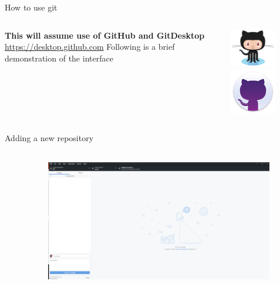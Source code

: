 \documentclass[10pt]{beamer}
\begin{document}
{\begin{frame}[fragile]{How to use git}
\begin{columns}[T]
\begin{column}{.8\textwidth}
\textbf{This will assume use of GitHub and GitDesktop\\}
\url{https://desktop.github.com} \newline \newline 
Following is a brief demonstration of the interface
\end{column}
\begin{column}{.2\textwidth}
\includegraphics[width=2cm]{Figs/git/Octocat} \newline \newline \newline 
\includegraphics[width=2cm]{Figs/git/gitdesktop}
\end{column}
\end{columns}
\end{frame}


\begin{frame}[fragile]{Adding a new repository}
\begin{columns}[T]
\begin{column}{.12\textwidth}
\end{column}
\begin{column}{.88\textwidth}
\includegraphics[width=10cm]{Figs/GHD/outline_02}
\end{column}
\end{columns}
\end{frame}



}
\end{document}
